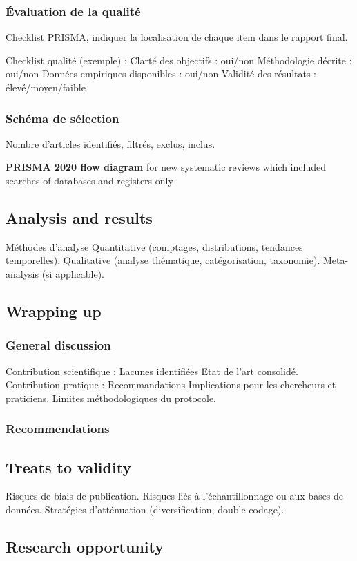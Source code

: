 \documentclass[a4paper,12pt]{article}
\begin{document}
\subsubsection{Évaluation de la qualité}
\label{sec:orgb1087d1}
Checklist PRISMA, indiquer la localisation de chaque item dans le rapport final.

Checklist qualité (exemple) :
    Clarté des objectifs : oui/non
    Méthodologie décrite : oui/non
    Données empiriques disponibles : oui/non
    Validité des résultats : élevé/moyen/faible
\subsubsection{Schéma de sélection}
\label{sec:org6184448}
Nombre d’articles identifiés, filtrés, exclus, inclus.

\textbf{PRISMA 2020 flow diagram} for new systematic reviews which included searches of databases and registers only
\subsection{Analysis and results}
\label{sec:org95e9874}
Méthodes d’analyse
    Quantitative (comptages, distributions, tendances temporelles).
    Qualitative (analyse thématique, catégorisation, taxonomie).
    Meta-analysis (si applicable).
\subsection{Wrapping up}
\label{sec:org225a841}
\subsubsection{General discussion}
\label{sec:org4731491}
Contribution scientifique :
    Lacunes identifiées
    Etat de l’art consolidé.
Contribution pratique :
    Recommandations
    Implications pour les chercheurs et praticiens.
Limites méthodologiques du protocole.
\subsubsection{Recommendations}
\label{sec:org3878fef}
\subsection{Treats to validity}
\label{sec:org9c995d7}
Risques de biais de publication.
Risques liés à l’échantillonnage ou aux bases de données.
Stratégies d’atténuation (diversification, double codage).
\subsection{Research opportunity}
\label{sec:orgd83c84b}
\end{document}
